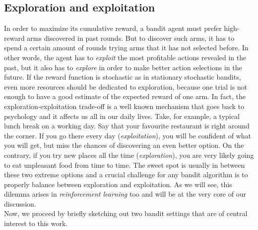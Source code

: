 \subsection{Exploration and exploitation} \label{eedilemma}
In order to maximize its cumulative reward, a bandit agent must prefer high-reward arms discovered in past rounds. But to discover such arms, it has to spend a certain amount of rounds trying arms that it has not selected before. In other words, the agent has to \emph{exploit} the most profitable actions revealed in the past, but it also has to \emph{explore} in order to make better action selections in the future. If the reward function is stochastic as in stationary stochastic bandits, even more resources should be dedicated to exploration, because one trial is not enough to have a good estimate of the expected reward of one arm.  In fact, the exploration-exploitation trade-off is a well known mechanism that goes back to psychology and it affects us all in our daily lives. Take, for example, a typical lunch break on a working day. Say that your favourite restaurant is right around the corner. If you go there every day (\emph{exploitation}), you will be confident of what you will get, but miss the chances of discovering an even better option. On the contrary, if you try new places all the time (\emph{exploration}), you are very likely going to eat unpleasant food from time to time. The sweet spot is usually in between these two extreme options and a crucial challenge for any bandit algorithm is to properly balance between exploration and exploitation. As we will see, this dilemma arises in \emph{reinforcement learning} too and will be at the very core of our discussion.
\\ Now, we proceed by briefly sketching out two bandit settings that are of central interest to this work.

